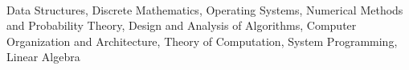 \\Data Structures, Discrete Mathematics, Operating Systems, Numerical Methods and Probability Theory, Design and Analysis of Algorithms, Computer Organization and Architecture, Theory of Computation, System Programming, Linear Algebra




